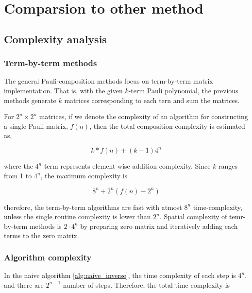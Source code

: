 \documentclass[twocolumn]{article}
\begin{document}
\section{Comparsion to other method}

\subsection{Complexity analysis}

\subsubsection{Term-by-term methods}

The general Pauli-composition methods focus on 
term-by-term matrix implementation. That is, with the given 
$k$-term Pauli polynomial, the previous methods generate $k$ matrices corresponding to 
each tern and sum the matrices.

For $2^n \times 2^n$ matrices, if we denote the complexity of an algorithm for constructing a single Pauli matrix,
$f(n)$, then the total composition complexity is estimated as,

\begin{equation}
    \label{eq:k-complexity}
    k * f(n) + (k-1) 4^n
\end{equation}

where the $4^n$ term represents element wise addition complexity.
Since $k$ ranges from 1 to $4^n$, the maximum complexity is

\begin{equation}
    \label{eq:max_complexity}
    8^n + 2^n(f(n)-2^n)
\end{equation}

therefore, the term-by-term algorithms are fast with atmost $8^n$ time-complexity, 
unless the single routine complexity is lower than $2^n$.
Spatial complexity of temr-by-term methods is $2 \cdot 4^n$ by preparing 
zero matrix and iteratively adding each terms to the zero matrix.

\subsubsection{Algorithm complexity}

In the naive algorithm \ref{alg:naive_inverse},
the time complexity of each step is $4^n$, and there are $2^{n-1}$ 
number of steps. Therefore, the total time complexity is 
\end{document}
